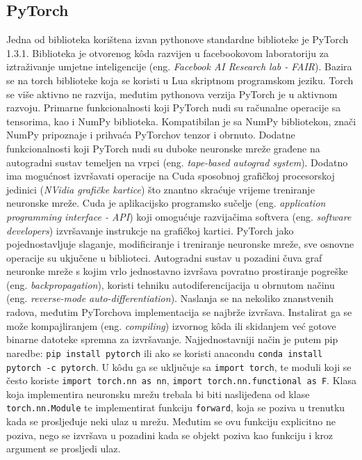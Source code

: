 \subsection{PyTorch}
Jedna od biblioteka korištena izvan pythonove standardne biblioteke je PyTorch 1.3.1. Biblioteka je otvorenog k\^oda razvijen u facebookovom laboratoriju za iztraživanje umjetne inteligencije  (eng. \textit{Facebook AI Research lab - FAIR}). Bazira se na torch biblioteke koja se koristi u Lua skriptnom programskom jeziku. Torch se više aktivno ne razvija, međutim pythonova verzija PyTorch je u aktivnom razvoju. Primarne funkcionalnosti koji PyTorch nudi su računalne operacije sa tensorima, kao i NumPy biblioteka. Kompatibilan je sa NumPy bibliotekon, znači NumPy pripoznaje i prihvaća PyTorchov tenzor i obrnuto. Dodatne funkcionalnosti koji PyTorch nudi su duboke neuronske mreže građene na autogradni sustav temeljen na vrpci (eng. \textit{tape-based autograd system}). Dodatno ima mogućnost izvršavati operacije na Cuda sposobnoj grafičkoj procesorskoj jedinici (\emph{NVidia grafičke kartice}) što znantno skraćuje vrijeme treniranje neuronske mreže. Cuda je aplikacijsko programsko sučelje (eng. \textit{application programming interface - API}) koji omogućuje razvijačima softvera (eng. \textit{software developers}) izvršavanje instrukcje na grafičkoj kartici. PyTorch jako pojednostavljuje slaganje, modificiranje i treniranje neuronske mreže, sve osnovne operacije su ukjučene u biblioteci. Autogradni sustav u pozadini čuva graf neuronke mreže s kojim vrlo jednostavno izvršava povratno prostiranje pogreške (eng. \textit{backpropagation}), koristi tehniku autodiferencijacija u obrnutom načinu (eng. \textit{reverse-mode auto-differentiation}). Naslanja se na nekoliko znanstvenih radova, međutim PyTorchova implementacija se najbrže izvršava. Instalirat ga se može kompajliranjem (eng. \textit{compiling}) izvornog k\^oda ili skidanjem već gotove binarne datoteke spremna za izvršavanje. Najjednostavniji način je putem pip naredbe: \lstinline$pip install pytorch$ ili ako se koristi anacondu \lstinline$conda install pytorch -c pytorch$. U k\^odu ga se uključuje sa \lstinline$import torch$, te moduli koji se često koriste \lstinline$import torch.nn as nn$, \lstinline$import torch.nn.functional as F$. Klasa koja implementira neuronsku mrežu trebala bi biti naslijeđena od klase \lstinline$torch.nn.Module$ te implementirat funkciju \lstinline$forward$, koja se poziva u trenutku kada se prosljeđuje neki ulaz u mrežu. Međutim se ovu funkciju explicitno ne poziva, nego se izvršava u pozadini kada se objekt poziva kao funkciju i kroz argument se prosljedi ulaz. 

